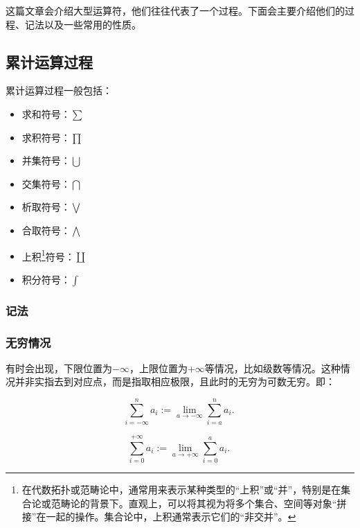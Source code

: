 
\begin{issues}
\issueDraft
\end{issues}

这篇文章会介绍大型运算符，他们往往代表了一个过程。下面会主要介绍他们的过程、记法以及一些常用的性质。

\subsection{累计运算过程}

累计运算过程一般包括：
\begin{itemize}
\item 求和符号：$\sum$
\item 求积符号：$\prod$
\item 并集符号：$\bigcup$
\item 交集符号：$\bigcap$
\item 析取符号：$\bigvee$
\item 合取符号：$\bigwedge$
\item 上积\footnote{在代数拓扑或范畴论中，通常用来表示某种类型的“上积”或“并”，特别是在集合论或范畴论的背景下。直观上，可以将其视为将多个集合、空间等对象“拼接”在一起的操作。集合论中，上积通常表示它们的“非交并”。}符号：$\coprod$
\item 积分符号：$\int$
\end{itemize}


\subsubsection{记法}

\subsubsection{无穷情况}

有时会出现，下限位置为$-\infty$，上限位置为$+\infty$等情况，比如级数等情况。这种情况并非实指去到对应点，而是指取相应极限，且此时的无穷为可数无穷。即：

\begin{equation}
\sum_{i=-\infty}^n a_i:= \lim_{a\to-\infty}\sum_{i=a}^n a_i.~
\end{equation}

\begin{equation}
\sum_{i=0}^{+\infty} a_i:= \lim_{a\to+\infty}\sum_{i=0}^a a_i.~
\end{equation}

